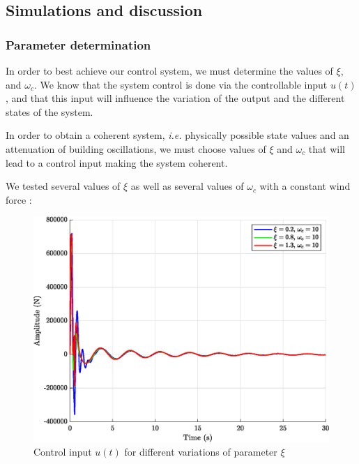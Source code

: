 \subsection{Simulations and discussion}
\subsubsection{Parameter determination}
In order to best achieve our control system, we must determine the values of $\xi$, and $\omega_c$. We know that the system control is done via the controllable input $u(t)$, and that this input will influence the variation of the output and the different states of the system.\par
In order to obtain a coherent system, {\it i.e.} physically possible state values and an attenuation of building oscillations, we must choose values of $\xi$ and $\omega_c$ that will lead to a control input making the system coherent.\par
We tested several values of $\xi$ as well as several values of $\omega_c$ with a constant wind force :
\begin{figure}[H]
    \centering
    \includegraphics[width=\textwidth]{resources/eps/xi-variations.eps}
    \caption{Control input $u(t)$ for different variations of parameter $\xi$}
\end{figure}
